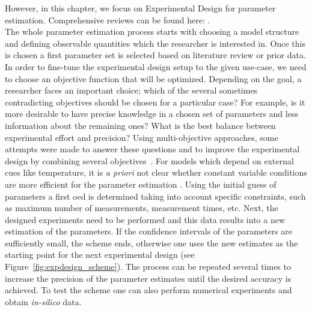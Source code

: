 \documentclass[graybox]{svmult}
\begin{document}
However, in this chapter, we focus on Experimental Design for parameter estimation.
Comprehensive reviews can be found here: \cite{atkinsonDevelopmentsDesignExperiments1982, franceschiniModelbasedDesignExperiments2008,sunParameterEstimation2011,vilasPredictiveFood2016}.\\\linebreak
The whole parameter estimation process starts with choosing a model structure and defining observable quantities which the researcher is interested in.
Once this is chosen a first parameter set is selected based on literature review or prior data.
In order to fine-tune the experimental design setup to the given use-case, we need to choose an objective function that will be optimized.
Depending on the goal, a researcher faces an important choice; which of the several sometimes contradicting objectives should be chosen for a particular case?
For example, is it more desirable to have precise knowledge in a chosen set of parameters and less information about the remaining ones?
What is the best balance between experimental effort and precision?
Using multi-objective approaches, some attempts were made to answer these questions and to improve the experimental design by combining several objectives~\cite{telenOptimalExperimentDesign2012, logistRobustMultiobjectiveOptimal2011}.
For models which depend on external cues like temperature, it is {\it a priori} not clear whether constant variable conditions are more efficient for the parameter estimation \cite{versyckIntroducingOptimal1999,garciaQualityShelflifePrediction2015}.
Using the initial guess of parameters a first \ac{oed} is determined taking into account specific constraints, such as maximum number of measurements, measurement times, etc.
Next, the designed experiments need to be performed and this data results into a new estimation of the parameters.
If the confidence intervals of the parameters are sufficiently small, the scheme ends, otherwise one uses the new estimates as the starting point for the next experimental design (see Figure~\ref{fig:expdesign_scheme}).
The process can be repeated several times to increase the precision of the parameter estimates until the desired accuracy is achieved.
To test the scheme one can also perform numerical experiments and obtain {\it in-silico} data.
%
%
%
\end{document}
